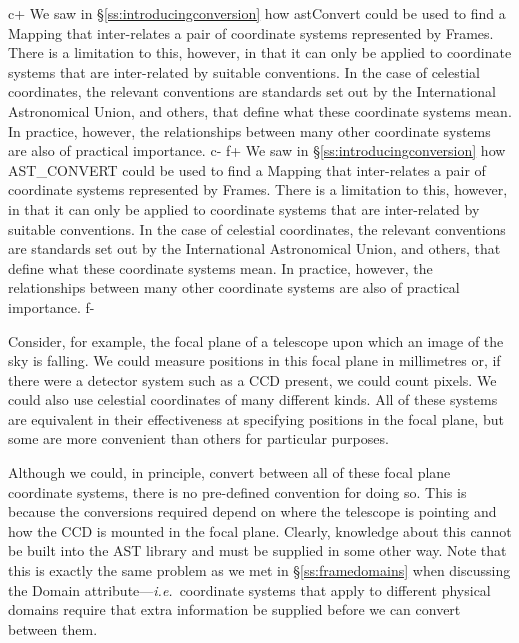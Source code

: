 \documentclass[twoside,11pt]{starlink}
\providecommand{\secref}[1]{\S\ref{#1}}
\begin{document}
c+
We saw in \secref{ss:introducingconversion} how astConvert could be
used to find a Mapping that inter-relates a pair of coordinate systems
represented by Frames. There is a limitation to this, however, in that
it can only be applied to coordinate systems that are inter-related by
suitable conventions. In the case of celestial coordinates, the
relevant conventions are standards set out by the International
Astronomical Union, and others, that define what these coordinate
systems mean. In practice, however, the relationships between many
other coordinate systems are also of practical importance.
c-
f+
We saw in \secref{ss:introducingconversion} how AST\_CONVERT could be
used to find a Mapping that inter-relates a pair of coordinate systems
represented by Frames. There is a limitation to this, however, in that
it can only be applied to coordinate systems that are inter-related by
suitable conventions. In the case of celestial coordinates, the
relevant conventions are standards set out by the International
Astronomical Union, and others, that define what these coordinate
systems mean. In practice, however, the relationships between many
other coordinate systems are also of practical importance.
f-

Consider, for example, the focal plane of a telescope upon which an
image of the sky is falling. We could measure positions in this focal
plane in millimetres or, if there were a detector system such as a CCD
present, we could count pixels. We could also use celestial
coordinates of many different kinds. All of these systems are
equivalent in their effectiveness at specifying positions in the focal
plane, but some are more convenient than others for particular
purposes.

Although we could, in principle, convert between all of these focal
plane coordinate systems, there is no pre-defined convention for doing
so. This is because the conversions required depend on where the
telescope is pointing and how the CCD is mounted in the focal
plane. Clearly, knowledge about this cannot be built into the AST
library and must be supplied in some other way. Note that this is
exactly the same problem as we met in \secref{ss:framedomains} when
discussing the Domain attribute---\emph{i.e.}\ coordinate systems that
apply to different physical domains require that extra information be
supplied before we can convert between them.
\end{document}
